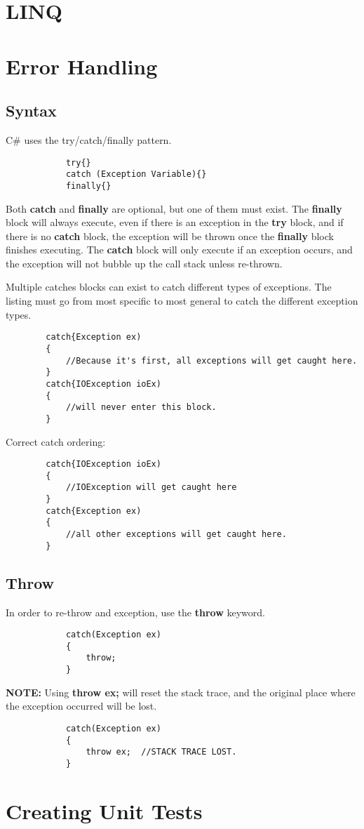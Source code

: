 \documentclass {amsart}
\begin{document}
\section{LINQ}

\section{Error Handling}
	\subsection{Syntax}  C\# uses the try/catch/finally pattern.
		\begin{lstlisting}
			try{}
			catch (Exception Variable){}
			finally{}
		\end{lstlisting}
	Both {\bf catch} and {\bf finally} are optional, but one of them must exist.  The {\bf finally} block will always execute, even if there is an exception in the {\bf try} block, and if there is no {\bf catch} block, the exception will be thrown once the {\bf finally} block finishes executing.  The {\bf catch} block will only execute if an exception occurs, and the exception will not bubble up the call stack unless re-thrown.  
		
	Multiple catches blocks can exist to catch different types of exceptions.  The listing must go from most specific to most general to catch the different exception types. 

	\begin{lstlisting}
		catch{Exception ex)
		{
			//Because it's first, all exceptions will get caught here.
		}
		catch{IOException ioEx)
		{
			//will never enter this block. 
		}
	\end{lstlisting}
	
	Correct catch ordering:

	\begin{lstlisting}
		catch{IOException ioEx)
		{
			//IOException will get caught here
		}
		catch{Exception ex)
		{
			//all other exceptions will get caught here.
		}
	\end{lstlisting}
	\subsection{Throw}  In order to re-throw and exception, use the {\bf throw} keyword.  
		\begin{lstlisting}
			catch(Exception ex)
			{
				throw;
			}
		\end{lstlisting}
	{\bf NOTE:} Using {\bf throw ex;} will reset the stack trace, and the original place where the exception occurred will be lost.
		\begin{lstlisting}
			catch(Exception ex)
			{
				throw ex;  //STACK TRACE LOST.
			}
		\end{lstlisting}
		

\section{Creating Unit Tests}
\end{document}

